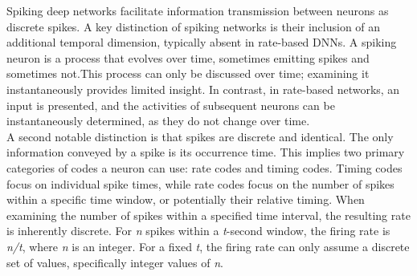 
\noindent Spiking deep networks facilitate information transmission between neurons as discrete spikes. A key distinction of spiking networks is their inclusion of an additional temporal dimension, typically absent in rate-based DNNs. A spiking neuron is a process that evolves over time, sometimes emitting spikes and sometimes not.This process can only be discussed over time; examining it instantaneously provides limited insight. In contrast, in rate-based networks, an input is presented, and the activities of subsequent neurons can be instantaneously determined, as they do not change over time.\\




\noindent A second notable distinction is that spikes are discrete and identical. The only information conveyed by a spike is its occurrence time. This implies two primary categories of codes a neuron can use: rate codes and timing codes. Timing codes focus on individual spike times, while rate codes focus on the number of spikes within a specific time window, or potentially their relative timing. When examining the number of spikes within a specified time interval, the resulting rate is inherently discrete. For \textit{n} spikes within a \textit{t}-second window, the firing rate is \textit{n/t}, where \textit{n} is an integer. For a fixed \textit{t}, the firing rate can only assume a discrete set of values, specifically integer values of \textit{n}. \\

